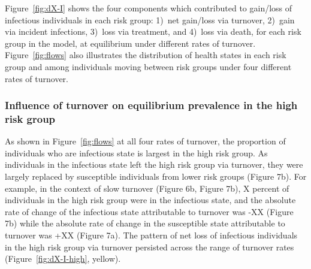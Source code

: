 \par
Figure~\ref{fig:dX-I} shows the four components which contributed to 
gain/loss of infectious individuals in each risk group:
1)~net gain/loss via turnover,
2)~gain via incident infections,
3)~loss via treatment, and
4)~loss via death,
for each risk group in the model,
at equilibrium under different rates of turnover.
Figure~\ref{fig:flows} also illustrates
the distribution of health states in each risk group
and among individuals moving between risk groups
under four different rates of turnover.
\subsubsection{Influence of turnover on equilibrium prevalence in the high risk group}		%
\label{sss:res-prev-high}
As shown in Figure~\ref{fig:flows} at all four rates of turnover,
the proportion of individuals 
who are infectious state is largest in the high risk group. 
As individuals in the infectious state left
the high risk group via turnover, they were largely 
replaced by susceptible individuals from lower risk groups (Figure 7b). 		%
For example, in the context of slow turnover (Figure 6b, Figure 7b), 			%
X percent of individuals in the high risk group were in the infectious state,
and the absolute rate of change of the infectious state 
attributable to turnover was -XX (Figure 7b) while the
absolute rate of change in the susceptible state attributable to 
turnover was +XX (Figure 7a). The pattern of net loss of 
infectious individuals in the high risk group via turnover
persisted across the range of turnover rates (Figure~\ref{fig:dX-I-high}, yellow).			%

